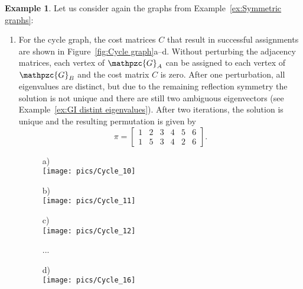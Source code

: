 \documentclass
[
    a4paper,
    DIV=11,
    abstracton
]
{scrartcl}
\newcommand{\subfiguretitle}[1]{{\scriptsize{#1}} \\[1ex]}
\newcommand{\mc}[1]{\mathpzc{#1}}
\theoremstyle{definition}
\newtheorem{example}[theorem]{Example}
\begin{document}
\begin{example}
Let us consider again the graphs from Example~\ref{ex:Symmetric graphs}:
\begin{enumerate}[leftmargin=0em,itemindent=1.7em,labelsep=0.3em,label=\roman*)] \setlength{\itemsep}{0mm}
\item For the cycle graph, the cost matrices $ C $ that result in successful assignments are shown in Figure~\ref{fig:Cycle graph}a--d. Without perturbing the adjacency matrices, each vertex of $ \mc{G}_A $ can be assigned to each vertex of $ \mc{G}_B $ and the cost matrix $ C $ is zero. After one perturbation, all eigenvalues are distinct, but due to the remaining reflection symmetry the solution is not unique and there are still two ambiguous eigenvectors (see Example~\ref{ex:GI distint eigenvalues}). After two iterations, the solution is unique and the resulting permutation is given by
\begin{equation*}
    \pi =
    \begin{bmatrix}
        1 & 2 & 3 & 4 & 5 & 6 \\
        1 & 5 & 3 & 4 & 2 & 6
    \end{bmatrix}.
\end{equation*}

\begin{figure}[htb]
    \centering
    \begin{minipage}[c]{0.23\textwidth}
        \centering
        \subfiguretitle{a)}
        \texttt{[image: pics/Cycle\_10]}
    \end{minipage}
    \begin{minipage}[c]{0.23\textwidth}
        \centering
        \subfiguretitle{b)}
        \texttt{[image: pics/Cycle\_11]}
    \end{minipage}
    \begin{minipage}[c]{0.23\textwidth}
        \centering
        \subfiguretitle{c)}
        \texttt{[image: pics/Cycle\_12]}
    \end{minipage}
    \begin{minipage}[c]{0.03\textwidth}
        \vspace*{3ex} ...
    \end{minipage}
    \begin{minipage}[c]{0.23\textwidth}
        \centering
        \subfiguretitle{d)}
        \texttt{[image: pics/Cycle\_16]}
    \end{minipage} \\[1ex]
    

\end{figure}
\end{enumerate}
\end{example}
\end{document}
